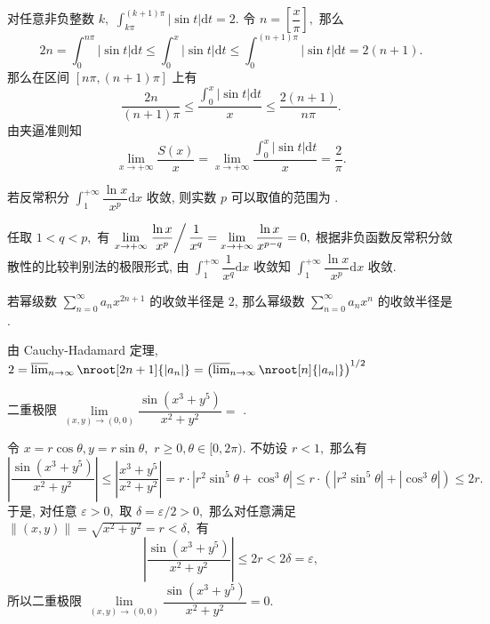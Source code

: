 \begin{solution}
对任意非负整数 $k,$ $\int_{k\pi}^{(k+1)\pi} \lvert \sin t \rvert \mathrm{d} t = 2.$ 令 $n = \left[ \dfrac{x}{\pi} \right],$ 那么
\[2n = \int_0^{n\pi} \lvert \sin t \rvert \mathrm{d} t \leqslant \int_0^x \lvert \sin t \rvert \mathrm{d} t \leqslant \int_0^{(n+1)\pi} \lvert \sin t \rvert \mathrm{d} t = 2(n+1).\]
那么在区间 $[n\pi, (n+1)\pi]$ 上有
\[\dfrac{2n}{(n+1)\pi} \leqslant \dfrac{\int_0^x \lvert \sin t \rvert \mathrm{d} t}{x} \leqslant \dfrac{2(n+1)}{n\pi}.\]
由夹逼准则知
\[\lim\limits_{x\to+\infty} \dfrac{S(x)}{x} = \lim\limits_{x\to+\infty} \dfrac{\int_0^x \lvert \sin t \rvert \mathrm{d} t}{x} = \dfrac{2}{\pi}.\]
\end{solution}

\begin{question}
若反常积分 $\int_1^{+\infty} \dfrac{\ln x}{x^p} \mathrm{d} x$ 收敛, 则实数 $p$ 可以取值的范围为 \fillin[$(1, +\infty)$ (或写 $p > 1$)].
\end{question}

\begin{solution}
任取 $1 < q < p,$ 有 $\lim\limits_{x\to+\infty} \left. \dfrac{\ln x}{x^p} \right/ \dfrac{1}{x^q} = \lim\limits_{x\to+\infty} \dfrac{\ln x}{x^{p-q}} = 0,$ 根据非负函数反常积分敛散性的比较判别法的极限形式, 由 $\int_1^{+\infty} \dfrac{1}{x^q} \mathrm{d} x$ 收敛知 $\int_1^{+\infty} \dfrac{\ln x}{x^p} \mathrm{d} x$ 收敛.
\end{solution}

\begin{question}
若幂级数 $\sum\limits_{n=0}^\infty a_n x^{2n+1}$ 的收敛半径是 $2$, 那么幂级数 $\sum\limits_{n=0}^\infty a_n x^n$ 的收敛半径是 \fillin[$4$].
\end{question}

\begin{solution}
由 Cauchy-Hadamard 定理, $2 = \varlimsup_{n\to\infty}\nroot[2n+1]{\lvert a_n
\rvert} = \left( \varlimsup_{n\to\infty}\nroot[n]{\lvert a_n \rvert} \right)^{1/2}$
\end{solution}

\begin{question}
二重极限 $\lim\limits_{(x,y) \to (0,0)} \dfrac{\sin(x^3 + y^5)}{x^2 + y^2} =$ \fillin[$0$].
\end{question}

\begin{solution}
令 $x = r\cos\theta, y = r\sin\theta,$ $r \geqslant 0, \theta \in [0, 2\pi).$ 不妨设 $r < 1,$ 那么有
\[\left\lvert \dfrac{\sin(x^3 + y^5)}{x^2 + y^2} \right\rvert \leqslant \left\lvert \dfrac{x^3 + y^5}{x^2 + y^2} \right\rvert = r \cdot \left\lvert r^2\sin^5\theta + \cos^3\theta \right\rvert \leqslant r \cdot \left( \left\lvert r^2\sin^5\theta \right\rvert + \left\lvert \cos^3\theta \right\rvert \right) \leqslant 2 r.\]
于是, 对任意 $\varepsilon > 0,$ 取 $\delta = \varepsilon / 2 > 0,$ 那么对任意满足 $\lVert (x, y) \rVert = \sqrt{x^2 + y^2} = r < \delta,$ 有
\[\left\lvert \dfrac{\sin(x^3 + y^5)}{x^2 + y^2} \right\rvert \leqslant 2r < 2\delta = \varepsilon,\]
所以二重极限 $\lim\limits_{(x,y) \to (0,0)} \dfrac{\sin(x^3 + y^5)}{x^2 + y^2} = 0.$
\end{solution}


